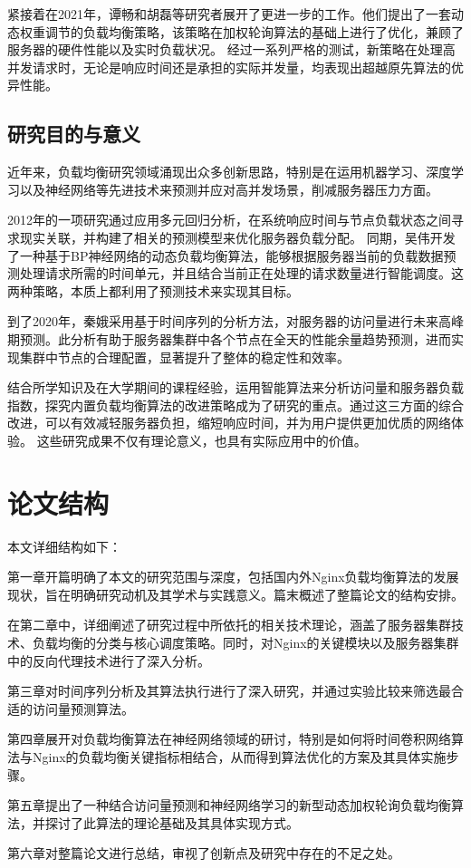 紧接着在2021年，谭畅和胡磊等研究者展开了更进一步的工作\cite{谭畅2021云中心基于}。他们提出了一套动态权重调节的负载均衡策略，该策略在加权轮询算法的基础上进行了优化，兼顾了服务器的硬件性能以及实时负载状况。
经过一系列严格的测试，新策略在处理高并发请求时，无论是响应时间还是承担的实际并发量，均表现出超越原先算法的优异性能。

\subsection{研究目的与意义}

近年来，负载均衡研究领域涌现出众多创新思路，特别是在运用机器学习、深度学习以及神经网络等先进技术来预测并应对高并发场景，削减服务器压力方面。

2012年的一项研究通过应用多元回归分析，在系统响应时间与节点负载状态之间寻求现实关联，并构建了相关的预测模型来优化服务器负载分配。
同期，吴伟开发了一种基于BP神经网络的动态负载均衡算法，能够根据服务器当前的负载数据预测处理请求所需的时间单元，并且结合当前正在处理的请求数量进行智能调度。这两种策略，本质上都利用了预测技术来实现其目标。

到了2020年，秦娥采用基于时间序列的分析方法，对服务器的访问量进行未来高峰期预测\cite{qbee}。此分析有助于服务器集群中各个节点在全天的性能余量趋势预测，进而实现集群中节点的合理配置，显著提升了整体的稳定性和效率。

结合所学知识及在大学期间的课程经验，运用智能算法来分析访问量和服务器负载指数，探究内置负载均衡算法的改进策略成为了研究的重点。通过这三方面的综合改进，可以有效减轻服务器负担，缩短响应时间，并为用户提供更加优质的网络体验。
这些研究成果不仅有理论意义，也具有实际应用中的价值。
\section{论文结构}

本文详细结构如下：

第一章开篇明确了本文的研究范围与深度，包括国内外Nginx负载均衡算法的发展现状，旨在明确研究动机及其学术与实践意义。篇末概述了整篇论文的结构安排。

在第二章中，详细阐述了研究过程中所依托的相关技术理论，涵盖了服务器集群技术、负载均衡的分类与核心调度策略。同时，对Nginx的关键模块以及服务器集群中的反向代理技术进行了深入分析。

第三章对时间序列分析及其算法执行进行了深入研究，并通过实验比较来筛选最合适的访问量预测算法。

第四章展开对负载均衡算法在神经网络领域的研讨，特别是如何将时间卷积网络算法与Nginx的负载均衡关键指标相结合，从而得到算法优化的方案及其具体实施步骤。

第五章提出了一种结合访问量预测和神经网络学习的新型动态加权轮询负载均衡算法，并探讨了此算法的理论基础及其具体实现方式。

第六章对整篇论文进行总结，审视了创新点及研究中存在的不足之处。
